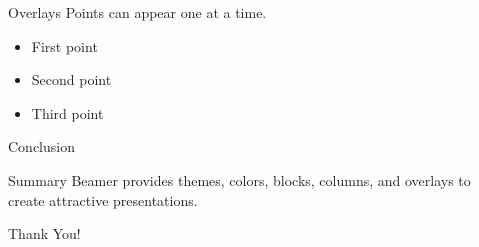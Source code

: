 \documentclass{beamer}
\begin{document}
\begin{frame}{Overlays}
    Points can appear one at a time.

    \begin{itemize}
        \item<1-> First point
        \item<2-> Second point
        \item<3-> Third point
    \end{itemize}
\end{frame}

\begin{frame}{Conclusion}
    \begin{block}{Summary}
        Beamer provides themes, colors, blocks, columns,
        and overlays to create attractive presentations.
    \end{block}

    \centering
    Thank You!
\end{frame}
\end{document}

